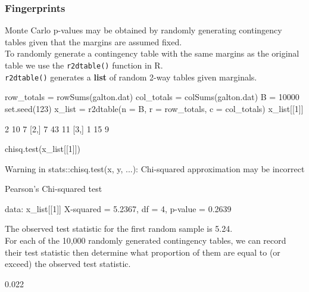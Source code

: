 \documentclass[a4paper]{article}
\begin{document}
\subsubsection{Fingerprints}
Monte Carlo p-values may be obtained by randomly generating contingency tables given that the margins are assumed fixed.\\
To randomly generate a contingency table with the same margins as the original table we use the \lstinline|r2dtable()| function in R.\\
\lstinline|r2dtable()| generates a \textbf{list} of random 2-way tables given marginals.
\begin{Schunk}
\begin{Sinput}
row_totals = rowSums(galton.dat)
col_totals = colSums(galton.dat)
B = 10000
set.seed(123)
x_list = r2dtable(n = B, 
                  r = row_totals,
                  c = col_totals)
x_list[[1]]
\end{Sinput}
\begin{Soutput}
     [,1] [,2] [,3]
[1,]    2   10    7
[2,]    7   43   11
[3,]    1   15    9
\end{Soutput}
\begin{Sinput}
chisq.test(x_list[[1]])
\end{Sinput}
\begin{Soutput}
Warning in stats::chisq.test(x, y, ...): Chi-squared approximation may be incorrect
\end{Soutput}
\begin{Soutput}

	Pearson's Chi-squared test

data:  x_list[[1]]
X-squared = 5.2367, df = 4, p-value = 0.2639
\end{Soutput}
\end{Schunk}
The observed test statistic for the first random sample is 5.24.\\
For each of the 10,000 randomly generated contingency tables, we can record their test statistic then determine what proportion of them are equal to (or exceed) the observed test statistic.
\begin{Schunk}
\begin{Soutput}
[1] 0.022
\end{Soutput}
\end{Schunk}
\end{document}
